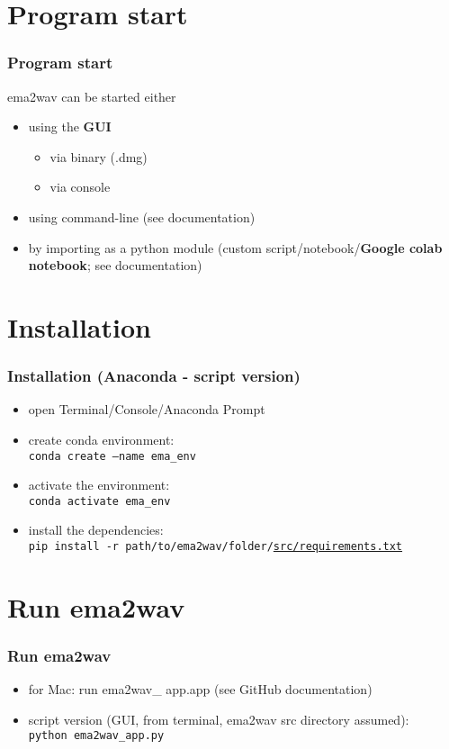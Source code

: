 \documentclass[12pt,a4paper]{beamer}
\begin{document}
\section{Program start}
\begin{frame}
    \frametitle{Program start}
    ema2wav can be started either
    \begin{itemize}
        \item using the \textbf{GUI}
        \begin{itemize}
            \item via binary (.dmg)
            \item via console
        \end{itemize}
        \item using command-line (see documentation)
        \item by importing as a python module (custom script/notebook/\textbf{Google colab notebook}; see documentation)
    \end{itemize}
    
\end{frame}

\section{Installation}
\begin{frame}
    \frametitle{Installation (Anaconda - script version)}
    \begin{itemize}
        \item open Terminal/Console/Anaconda Prompt
        \item create conda environment:\\
        \texttt{conda create --name ema\_env}
        \item activate the environment:\\
        \texttt{conda activate ema\_env}
        \item install the dependencies:\\
        \texttt{pip install -r path/to/ema2wav/folder/\underline{src/requirements.txt}}
    \end{itemize}
\end{frame}

\section{Run ema2wav}
\begin{frame}
    \frametitle{Run ema2wav}
    \begin{itemize}
        \item for Mac: run ema2wav\_ app.app (see GitHub documentation)
        \item script version (GUI, from terminal, ema2wav src directory assumed):\\
        \texttt{python ema2wav\_app.py}
    \end{itemize}
\end{frame}
\end{document}
